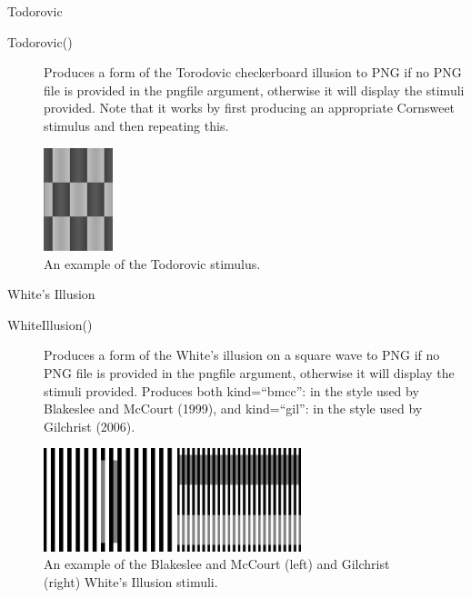 \documentclass{beamer}
\begin{document}
\begin{frame}[t]{Todorovic}
\begin{description}
\item[Todorovic()] Produces a form of the Torodovic checkerboard illusion to PNG if no PNG file is provided in the pngfile argument, otherwise it will display the stimuli provided. Note that it works by first producing an appropriate Cornsweet stimulus and then repeating this.
\end{description}
\begin{figure}[c]
\includegraphics[height=3cm]{todorovic20120814_1705.png}
\caption{An example of the Todorovic stimulus.}
\end{figure}
\end{frame}

\begin{frame}[t]{White's Illusion}
\begin{description}
\item[WhiteIllusion()] Produces a form of the White's illusion on a square wave to PNG if no PNG file is provided in the pngfile argument, otherwise it will display the stimuli provided. Produces both kind=``bmcc'': in the style used by Blakeslee and McCourt (1999), and kind=``gil'': in the style used by Gilchrist (2006).
\end{description}
\begin{figure}[c]
 \centering
  \begin{minipage}[b]{5 cm}
    \includegraphics[height=3cm]{whiteillusionbmcc20120814_1705.png}
  \end{minipage}
  \begin{minipage}[b]{5 cm}
    \includegraphics[height=3cm]{whiteillusiongil20120815_1138.png}
  \end{minipage}

  \caption{An example of the Blakeslee and McCourt (left) and Gilchrist (right) White's Illusion stimuli.}
\end{figure}
\end{frame}
\end{document}
